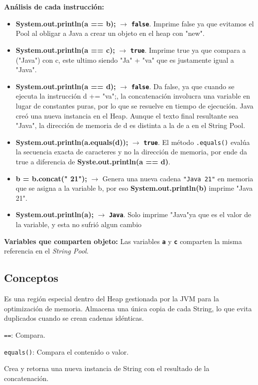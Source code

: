 \documentclass{article}
\begin{document}
\textbf{Análisis de cada instrucción:}
\begin{itemize}
    \item \textbf{System.out.println(a == b);} $\rightarrow$ \textbf{\texttt{false}}. Imprime false ya que evitamos el Pool al obligar a Java a crear un objeto en el heap con "new".
    \item \textbf{System.out.println(a == c);} $\rightarrow$ \textbf{\texttt{true}}. Imprime true ya que compara a ("Java") con c, este ultimo siendo "Ja" + "va" que es justamente igual a "Java".
    \item \textbf{System.out.println(a == d);} $\rightarrow$ \textbf{\texttt{false}}. Da false, ya que cuando se ejecuta la instrucción d += "va";, la concatenación involucra una variable en lugar de constantes puras, por lo que se resuelve en tiempo de ejecución. Java creó una nueva instancia en el Heap. Aunque el texto final resultante sea "Java", la dirección de memoria de d es distinta a la de a en el String Pool.
    \item \textbf{System.out.println(a.equals(d));} $\rightarrow$ \textbf{\texttt{true}}. El método \texttt{.equals()} evalúa la secuencia exacta de caracteres y no la dirección de memoria, por ende da true a diferencia de \textbf{Syste.out.println(a == d)}.
    \item \textbf{b = b.concat(" 21");} $\rightarrow$ Genera una nueva cadena \texttt{"Java 21"} en memoria que se asigna a la variable b, por eso \textbf{System.out.println(b)} imprime "Java 21".
    \item \textbf{System.out.println(a);} $\rightarrow$ \textbf{\texttt{Java}}. Solo imprime "Java"ya que es el valor de la variable, y esta no sufrió algun cambio
    \end{itemize}

\textbf{Variables que comparten objeto:} Las variables \textbf{\texttt{a}} y \textbf{\texttt{c}} comparten la misma referencia en el \textit{String Pool}.

\subsection*{Conceptos}
\begin{description}
    \item[String Pool:] Es una región especial dentro del Heap gestionada por la JVM para la optimización de memoria. Almacena una única copia de cada String, lo que evita duplicados cuando se crean cadenas idénticas.
    \item[Diferencia entre \texttt{==} y \texttt{equals()}:]
    \item \texttt{==}: Compara. 
    \item \texttt{equals()}: Compara el contenido o valor.
    \item[Comportamiento de \texttt{concat()}:] Crea y retorna una nueva instancia de String con el resultado de la concatenación.
\end{description}
\end{document}
